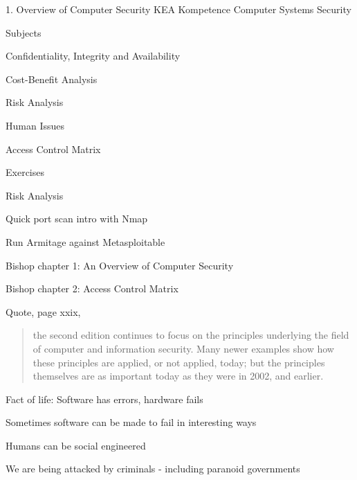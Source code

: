 \documentclass[Screen16to9,17pt]{foils}
\begin{document}
\mytitlepage
{1. Overview of Computer Security}
{KEA Kompetence Computer Systems Security \the\year}



\begin{list1}
\item Subjects
\begin{list2}
\item Confidentiality, Integrity and Availability
\item Cost-Benefit Analysis
\item Risk Analysis
\item Human Issues
\item Access Control Matrix
\end{list2}
\item Exercises
\begin{list2}
\item Risk Analysis
\item Quick port scan intro with Nmap
\item Run Armitage against Metasploitable
\end{list2}
\end{list1}




\begin{list1}
\item Bishop chapter 1: An Overview of Computer Security
\item Bishop chapter 2: Access Control Matrix
\end{list1}

Quote, page xxix,\\
\begin{quote}
the second edition continues to focus on the principles underlying the field of computer and information security. Many newer examples show how these principles are applied, or not applied, today; but the principles themselves are as important today as they were in 2002, and earlier.
\end{quote}


\begin{list1}
\item Fact of life: Software has errors, hardware fails
\item Sometimes software can be made to fail in interesting ways
\item Humans can be social engineered
\item We are being attacked by criminals - including paranoid governments
\end{list1}
\end{document}
